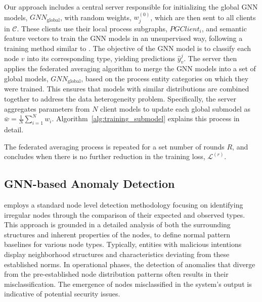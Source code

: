 Our approach includes a central server responsible for initializing the global GNN models, \({GNN}_{\text{global}}\), with random weights, \( w_j^{(0)} \), which are then sent to all clients in \( \mathcal{C} \). These clients use their local process subgraphs, \( PGClient_{i} \), and semantic feature vectors to train the GNN models in an unsupervised way, following a training method similar to \flash. The objective of the GNN model is to classify each node \( v \) into its corresponding type, yielding predictions \(\hat{y}_v^j\). The server then applies the federated averaging algorithm to merge the GNN models into a set of global models, \({GNN}_{\text{global}}\), based on the process entity categories on which they were trained. This ensures that models with similar distributions are combined together to address the data heterogeneity problem. Specifically, the server aggregates parameters from \( N \) client models to update each global submodel as \(\bar{w} = \frac{1}{N} \sum_{i=1}^{N} w_i\). Algorithm~\ref{alg:training_submodel} explains this process in detail.

The federated averaging process is repeated for a set number of rounds \( R \), and concludes when there is no further reduction in the training loss, \(\mathcal{L}^{(r)}\). 

\subsection{GNN-based Anomaly Detection}
\label{sys:anomaly_detection}

\Sys employs a standard node level detection methodology focusing on identifying irregular nodes through the comparison of their expected and observed types. This approach is grounded in a detailed analysis of both the surrounding structures and inherent properties of the nodes, to define normal pattern baselines for various node types. Typically, entities with malicious intentions display neighborhood structures and characteristics deviating from these established norms. In operational phases, the detection of anomalies that diverge from the pre-established node distribution patterns often results in their misclassification. The emergence of nodes misclassified in the system's output is indicative of potential security issues.

